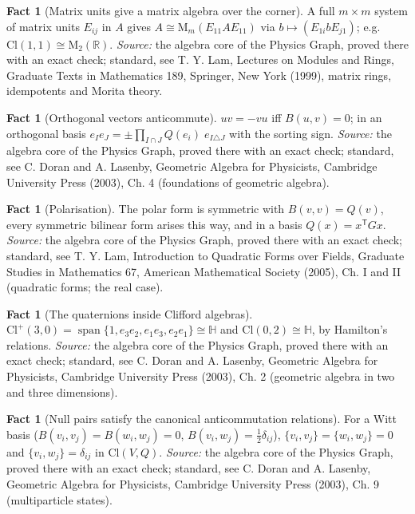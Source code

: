 \documentclass[11pt]{article}
\theoremstyle{definition}
\newtheorem{fact}[theorem]{Fact}
\theoremstyle{plain}
\providecommand{\Cl}{}\renewcommand{\Cl}{\mathrm{Cl}}
\providecommand{\HH}{}\renewcommand{\HH}{\mathbb{H}}
\providecommand{\Mat}{}\renewcommand{\Mat}{\mathrm{M}}
\providecommand{\R}{}\renewcommand{\R}{\mathbb{R}}
\begin{document}
\begin{fact}[Matrix units give a matrix algebra over the corner]\label{c:std-algebra.matrix-units}
A full $m \times m$ system of matrix units $E_{ij}$ in $A$ gives $A \cong \Mat_m(E_{11} A E_{11})$ via $b \mapsto (E_{1i} b E_{j1})$; e.g. $\Cl(1,1) \cong \Mat_2(\R)$.
\emph{Source:} the algebra core of the Physics Graph, proved there with an exact check; standard, see T. Y. Lam, Lectures on Modules and Rings, Graduate Texts in Mathematics 189, Springer, New York (1999), matrix rings, idempotents and Morita theory.
\end{fact}

\begin{fact}[Orthogonal vectors anticommute]\label{c:std-algebra.orthogonal-anticommute}
$uv = -vu$ iff $B(u,v) = 0$; in an orthogonal basis $e_I e_J = \pm \prod_{I \cap J} Q(e_i)\; e_{I \triangle J}$ with the sorting sign.
\emph{Source:} the algebra core of the Physics Graph, proved there with an exact check; standard, see C. Doran and A. Lasenby, Geometric Algebra for Physicists, Cambridge University Press (2003), Ch. 4 (foundations of geometric algebra).
\end{fact}

\begin{fact}[Polarisation]\label{c:std-algebra.polarisation}
The polar form is symmetric with $B(v,v) = Q(v)$, every symmetric bilinear form arises this way, and in a basis $Q(x) = x^{\mathsf T} G x$.
\emph{Source:} the algebra core of the Physics Graph, proved there with an exact check; standard, see T. Y. Lam, Introduction to Quadratic Forms over Fields, Graduate Studies in Mathematics 67, American Mathematical Society (2005), Ch. I and II (quadratic forms; the real case).
\end{fact}

\begin{fact}[The quaternions inside Clifford algebras]\label{c:std-algebra.quaternions}
$\Cl^{+}(3,0) = \operatorname{span}\{1, e_3e_2, e_1e_3, e_2e_1\} \cong \HH$ and $\Cl(0,2) \cong \HH$, by Hamilton's relations.
\emph{Source:} the algebra core of the Physics Graph, proved there with an exact check; standard, see C. Doran and A. Lasenby, Geometric Algebra for Physicists, Cambridge University Press (2003), Ch. 2 (geometric algebra in two and three dimensions).
\end{fact}

\begin{fact}[Null pairs satisfy the canonical anticommutation relations]\label{c:std-algebra.witt-basis-car}
For a Witt basis ($B(v_i,v_j) = B(w_i,w_j) = 0$, $B(v_i,w_j) = \tfrac12\delta_{ij}$), $\{v_i,v_j\} = \{w_i,w_j\} = 0$ and $\{v_i,w_j\} = \delta_{ij}$ in $\Cl(V,Q)$.
\emph{Source:} the algebra core of the Physics Graph, proved there with an exact check; standard, see C. Doran and A. Lasenby, Geometric Algebra for Physicists, Cambridge University Press (2003), Ch. 9 (multiparticle states).
\end{fact}
\end{document}
